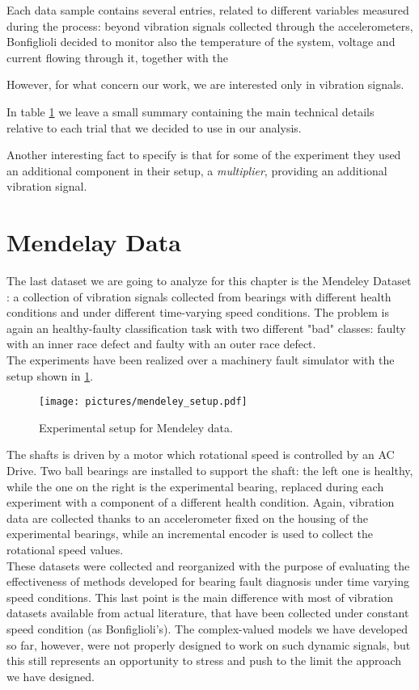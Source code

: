 \documentclass[../main.tex]{subfiles}
\begin{document}
Each data sample contains several entries, related to different variables measured during the process: beyond vibration signals collected through the accelerometers, Bonfiglioli decided to monitor also the temperature of the system, voltage and current flowing through it, together with the

However, for what concern our work, we are interested only in vibration signals.


In table \ref{} we leave a small summary containing the main technical details relative to each trial that we decided to use in our analysis. 

Another interesting fact to specify is that for some of the experiment they used an additional component in their setup, a \textit{multiplier}, providing an additional vibration signal.


\section{Mendelay Data}

The last dataset we are going to analyze for this chapter is the Mendeley Dataset \cite{mendeley_dataset}: a collection of vibration signals collected from bearings with different health conditions and under different time-varying speed conditions. The problem is again an healthy-faulty classification task with two different "bad" classes: faulty with an inner race defect and faulty with an outer race defect. \\
The experiments have been realized over a machinery fault simulator with the setup shown in \ref{fig:mendeley_setup}. 
\begin{figure}[!ht]
	\centering
	\texttt{[image: pictures/mendeley\_setup.pdf]}
	\caption{Experimental setup for Mendeley data.}
	\label{fig:mendeley_setup}
\end{figure}
The shafts is driven by a motor which rotational speed is controlled by an AC Drive. Two ball bearings are installed to support the shaft: the left one is healthy, while the one on the right is the experimental bearing, replaced during each experiment with a component of a different health condition. Again, vibration data are collected thanks to an accelerometer fixed on the housing of the experimental bearings,  while an incremental encoder is used to collect the rotational speed values.\\
These datasets were collected and reorganized with the purpose of evaluating the effectiveness of methods developed for bearing fault diagnosis under time varying speed conditions. This last point is the main difference with most of vibration datasets available from actual literature, that have been collected under constant speed condition (as Bonfiglioli's). The complex-valued models we have developed so far, however, were not properly designed to work on such dynamic signals, but this still represents an opportunity to stress and push to the limit the approach we have designed.
\end{document}
